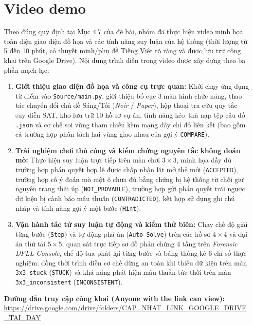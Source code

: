 \section{Video demo}
\label{sec:video-demo}

Theo đúng quy định tại Mục 4.7 của đề bài, nhóm đã thực hiện video minh họa toàn diện giao diện đồ họa và các tính năng suy luận của hệ thống (thời lượng từ 5 đến 10 phút, có thuyết minh/phụ đề Tiếng Việt rõ ràng và được lưu trữ công khai trên Google Drive). Nội dung trình diễn trong video được xây dựng theo ba phần mạch lạc:

\begin{enumerate}
    \item \textbf{Giới thiệu giao diện đồ họa và công cụ trực quan:} Khởi chạy ứng dụng từ điểm vào \texttt{Source/main.py}, giới thiệu bố cục 3 màn hình chức năng, thao tác chuyển đổi chủ đề Sáng/Tối (\emph{Noir} / \emph{Paper}), hộp thoại tra cứu quy tắc suy diễn SAT, kho lưu trữ 10 hồ sơ vụ án, tính năng kéo--thả nạp tệp câu đố \texttt{.json} và cơ chế soi vùng tham chiếu kèm mạng dây chỉ đỏ liên kết (bao gồm cả trường hợp phân tách hai vùng giao nhau của gợi ý \texttt{COMPARE}).
    \item \textbf{Trải nghiệm chơi thủ công và kiểm chứng nguyên tắc không đoán mò:} Thực hiện suy luận trực tiếp trên màn chơi $3 \times 3$, minh họa đầy đủ trường hợp phán quyết hợp lệ được chấp nhận lật mở thẻ mới (\texttt{ACCEPTED}), trường hợp cố ý đoán mò một ô chưa đủ bằng chứng bị hệ thống từ chối giữ nguyên trạng thái úp (\texttt{NOT\_PROVABLE}), trường hợp gửi phán quyết trái ngược dữ kiện bị cảnh báo mâu thuẫn (\texttt{CONTRADICTED}), kết hợp sử dụng ghi chú nháp và tính năng gợi ý một bước (\texttt{Hint}).
    \item \textbf{Vận hành tác tử suy luận tự động và kiểm thử biên:} Chạy chế độ giải từng bước (\texttt{Step}) và tự động phá án (\texttt{Auto Solve}) trên các hồ sơ $4 \times 4$ và đại án thử tải $5 \times 5$; quan sát trực tiếp sơ đồ phản chứng 4 tầng trên \emph{Forensic DPLL Console}, chế độ tua phát lại từng bước và bảng thống kê 6 chỉ số thực nghiệm; đồng thời trình diễn cơ chế dừng an toàn khi thiếu dữ kiện trên màn \texttt{3x3\_stuck} (\texttt{STUCK}) và khả năng phát hiện mâu thuẫn tức thời trên màn \texttt{3x3\_inconsistent} (\texttt{INCONSISTENT}).
\end{enumerate}

\begin{tcolorbox}[colback=gray!5, colframe=blue!65!black, title=\textbf{Liên kết Video Demo sản phẩm (Google Drive)}]
\textbf{Đường dẫn truy cập công khai (Anyone with the link can view):}\\
\url{https://drive.google.com/drive/folders/CAP_NHAT_LINK_GOOGLE_DRIVE_TAI_DAY}
\end{tcolorbox}
